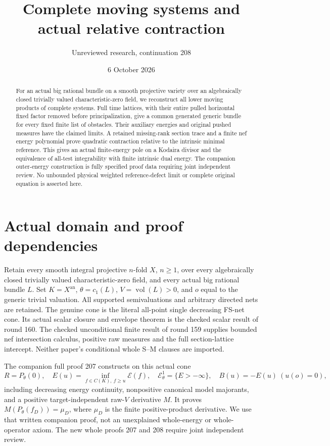\documentclass[11pt]{article}
\title{Complete moving systems and actual relative contraction}
\author{Unreviewed research, continuation 208}
\date{6 October 2026}
\newcommand{\vol}{\operatorname{vol}}
\newcommand{\EE}{\mathcal E^1_\theta}
\begin{document}
\maketitle
\begin{abstract}
For an actual big rational bundle on a smooth projective variety
over an algebraically closed trivially valued characteristic-zero
field, we reconstruct all lower moving products of complete systems.
Full time lattices, with their entire pulled horizontal fixed factor
removed before principalization, give a common generated generic
bundle for every fixed finite list of obstacles. Their auxiliary
energies and original pushed measures have the claimed limits.
A retained missing-rank section trace and a finite nef energy
polynomial prove quadratic contraction relative to the intrinsic
minimal reference. This gives an actual finite-energy pole on a
Kodaira divisor and the equivalence of all-test integrability with
finite intrinsic dual energy. The companion outer-energy construction
is fully specified proof data requiring joint independent review.
No unbounded physical weighted reference-defect limit or complete
original equation is asserted here.
\end{abstract}

\section{Actual domain and proof dependencies}
Retain every smooth integral projective $n$-fold $X$, $n\geq1$,
over every algebraically closed trivially valued characteristic-zero
field, and every actual big rational bundle $L$.
Set $K=X^{\mathrm{an}}$, $\theta=c_1(L)$, $V=\vol(L)>0$,
and $o$ equal to the generic trivial valuation.
All supported semivaluations and arbitrary directed nets are retained.
The genuine cone is the literal all-point single decreasing FS-net
cone. Its actual scalar closure and envelope theorem is the checked
scalar result of round 160. The checked unconditional finite result
of round 159 supplies bounded nef intersection calculus, positive
raw measures and the full section-lattice intercept.
Neither paper's conditional whole S--M clauses are imported.

The companion full proof 207 constructs on this actual cone
\[
 R=P_\theta(0),\quad E(u)=\inf_{f\in C(K),\ f\geq u}\mathscr E(f),
 \quad \EE=\{E> -\infty\},\quad B(u)=-E(u)\ (u(o)=0),
                                                        \tag{1}
\]
including decreasing energy continuity, nonpositive canonical model
majorants, and a positive target-independent raw-$V$ derivative $M$.
It proves $M(P_\theta(f_D))=\mu_D$, where $\mu_D$ is the finite
positive-product derivative. We use that written companion proof,
not an unexplained whole-energy or whole-operator axiom.
The new whole proofs 207 and 208 require joint independent review.
\end{document}
